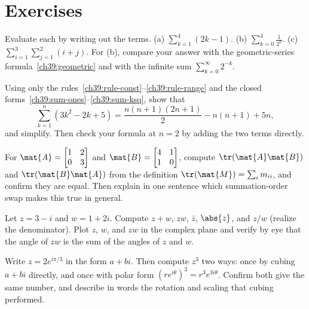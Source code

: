 \section{Exercises}
\label{ch39:exercises}

\begin{exercise}
\label{ch39:ex1}
Evaluate each by writing out the terms.
(a) $\displaystyle\sum_{k=1}^{4}(2k-1)$.\quad
(b) $\displaystyle\sum_{k=0}^{4} \tfrac{1}{2^k}$.\quad
(c) $\displaystyle\sum_{i=1}^{3}\sum_{j=1}^{2} (i + j)$.
For (b), compare your answer with the geometric-series formula~\eqref{ch39:geometric} and with the
infinite sum $\sum_{k=0}^\infty 2^{-k}$.
\end{exercise}

\begin{exercise}
\label{ch39:ex2}
Using only the rules~\eqref{ch39:rule-const}--\eqref{ch39:rule-range} and the closed
forms~\eqref{ch39:sum-ones}--\eqref{ch39:sum-ksq}, show that
\[
\sum_{k=1}^{n}(3k^2 - 2k + 5) = \frac{n(n+1)(2n+1)}{2} - n(n+1) + 5n,
\]
and simplify. Then check your formula at $n=2$ by adding the two terms directly.
\end{exercise}

\begin{exercise}
\label{ch39:ex3}
For $\mat{A} = \begin{bmatrix}1 & 2\\ 0 & 3\end{bmatrix}$ and $\mat{B} = \begin{bmatrix}4 & 1\\ 1 &
0\end{bmatrix}$, compute $\tr(\mat{A}\mat{B})$ and $\tr(\mat{B}\mat{A})$ from the definition
$\tr(\mat{M}) = \sum_i m_{ii}$, and confirm they are equal. Then explain in one sentence which
summation-order swap makes this true in general.
\end{exercise}

\begin{exercise}
\label{ch39:ex4}
Let $z = 3 - i$ and $w = 1 + 2i$. Compute $z + w$, $zw$, $\bar z$, $\abs{z}$, and $z/w$ (realize the
denominator). Plot $z$, $w$, and $zw$ in the complex plane and verify by eye that the angle of $zw$
is the sum of the angles of $z$ and $w$.
\end{exercise}

\begin{exercise}
\label{ch39:ex5}
Write $z = 2e^{i\pi/3}$ in the form $a + bi$. Then compute $z^3$ two ways: once by cubing $a+bi$
directly, and once with polar form $(re^{i\theta})^3 = r^3 e^{3i\theta}$. Confirm both give the same
number, and describe in words the rotation and scaling that cubing performed.
\end{exercise}

